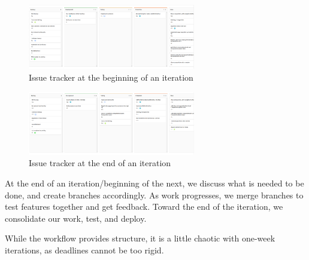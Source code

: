 \documentclass[11pt,a4paper]{article}
\begin{document}
\begin{figure}
    \centering
    \includegraphics[width=0.65\textwidth]{issues-beg}
    \caption{Issue tracker at the beginning of an iteration}
\end{figure}

\begin{figure}
    \centering
    \includegraphics[width=0.65\textwidth]{issues-end}
    \caption{Issue tracker at the end of an iteration}
\end{figure}

At the end of an iteration/beginning of the next, we discuss what is needed to be done, and create branches accordingly. As work progresses, we merge branches to test features together and get feedback. Toward the end of the iteration, we consolidate our work, test, and deploy.

While the workflow provides structure, it is a little chaotic with one-week iterations, as deadlines cannot be too rigid.
\end{document}
